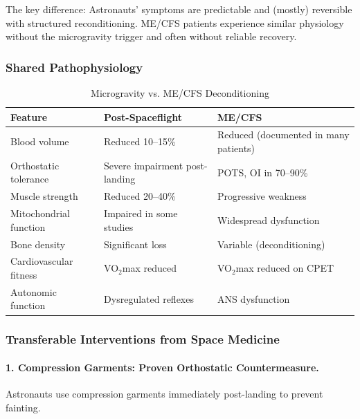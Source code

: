 The key difference: Astronauts' symptoms are predictable and (mostly) reversible with structured reconditioning. ME/CFS patients experience similar physiology without the microgravity trigger and often without reliable recovery.

\subsubsection{Shared Pathophysiology}

\begin{table}[htbp]
\centering
\caption{Microgravity vs. ME/CFS Deconditioning}
\label{tab:space-mecfs-comparison}
\small
\begin{tabular}{p{4.5cm}p{5cm}p{4.5cm}}
\toprule
\textbf{Feature} & \textbf{Post-Spaceflight} & \textbf{ME/CFS} \\
\midrule
Blood volume & Reduced 10--15\% & Reduced (documented in many patients) \\
Orthostatic tolerance & Severe impairment post-landing & POTS, OI in 70--90\% \\
Muscle strength & Reduced 20--40\% & Progressive weakness \\
Mitochondrial function & Impaired in some studies & Widespread dysfunction \\
Bone density & Significant loss & Variable (deconditioning) \\
Cardiovascular fitness & VO$_2$max reduced & VO$_2$max reduced on CPET \\
Autonomic function & Dysregulated reflexes & ANS dysfunction \\
\bottomrule
\end{tabular}
\end{table}

\subsubsection{Transferable Interventions from Space Medicine}

\paragraph{1. Compression Garments: Proven Orthostatic Countermeasure.}
Astronauts use compression garments immediately post-landing to prevent fainting.

